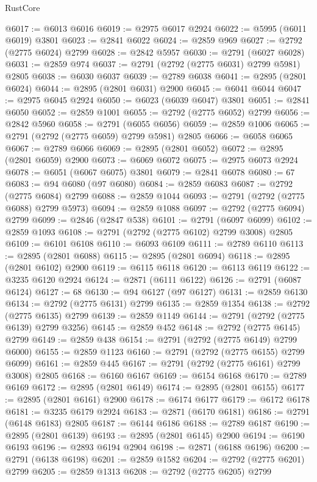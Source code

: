 \begin{lexlean}{RustCore}
\begin{coremodule}
@6017 := @6013 @6016
@6019 := @2975 @6017 @2924
@6022 := @5995 (@6011 @6019) @3801
@6023 := @2841 @6022
@6024 := @2859 @969
@6027 := @2792 (@2775 @6024) @2799
@6028 := @2842 @5957
@6030 := @2791 (@6027 @6028)
@6031 := @2859 @974
@6037 := @2791 (@2792 (@2775 @6031) @2799 @5981) @2805
@6038 := @6030 @6037
@6039 := @2789 @6038
@6041 := @2895 (@2801 @6024)
@6044 := @2895 (@2801 @6031) @2900
@6045 := @6041 @6044
@6047 := @2975 @6045 @2924
@6050 := @6023 (@6039 @6047) @3801
@6051 := @2841 @6050
@6052 := @2859 @1001
@6055 := @2792 (@2775 @6052) @2799
@6056 := @2842 @5960
@6058 := @2791 (@6055 @6056)
@6059 := @2859 @1006
@6065 := @2791 (@2792 (@2775 @6059) @2799 @5981) @2805
@6066 := @6058 @6065
@6067 := @2789 @6066
@6069 := @2895 (@2801 @6052)
@6072 := @2895 (@2801 @6059) @2900
@6073 := @6069 @6072
@6075 := @2975 @6073 @2924
@6078 := @6051 (@6067 @6075) @3801
@6079 := @2841 @6078
@6080 := 67
@6083 := @94 @6080 (@97 @6080)
@6084 := @2859 @6083
@6087 := @2792 (@2775 @6084) @2799
@6088 := @2859 @1044
@6093 := @2791 (@2792 (@2775 @6088) @2799 @5973)
@6094 := @2859 @1088
@6097 := @2792 (@2775 @6094) @2799
@6099 := @2846 (@2847 @538)
@6101 := @2791 (@6097 @6099)
@6102 := @2859 @1093
@6108 := @2791 (@2792 (@2775 @6102) @2799 @3008) @2805
@6109 := @6101 @6108
@6110 := @6093 @6109
@6111 := @2789 @6110
@6113 := @2895 (@2801 @6088)
@6115 := @2895 (@2801 @6094)
@6118 := @2895 (@2801 @6102) @2900
@6119 := @6115 @6118
@6120 := @6113 @6119
@6122 := @3235 @6120 @2924
@6124 := @2871 (@6111 @6122)
@6126 := @2791 (@6087 @6124)
@6127 := 68
@6130 := @94 @6127 (@97 @6127)
@6131 := @2859 @6130
@6134 := @2792 (@2775 @6131) @2799
@6135 := @2859 @1354
@6138 := @2792 (@2775 @6135) @2799
@6139 := @2859 @1149
@6144 := @2791 (@2792 (@2775 @6139) @2799 @3256)
@6145 := @2859 @452
@6148 := @2792 (@2775 @6145) @2799
@6149 := @2859 @438
@6154 := @2791 (@2792 (@2775 @6149) @2799 @6000)
@6155 := @2859 @1123
@6160 := @2791 (@2792 (@2775 @6155) @2799 @6099)
@6161 := @2859 @445
@6167 := @2791 (@2792 (@2775 @6161) @2799 @3008) @2805
@6168 := @6160 @6167
@6169 := @6154 @6168
@6170 := @2789 @6169
@6172 := @2895 (@2801 @6149)
@6174 := @2895 (@2801 @6155)
@6177 := @2895 (@2801 @6161) @2900
@6178 := @6174 @6177
@6179 := @6172 @6178
@6181 := @3235 @6179 @2924
@6183 := @2871 (@6170 @6181)
@6186 := @2791 (@6148 @6183) @2805
@6187 := @6144 @6186
@6188 := @2789 @6187
@6190 := @2895 (@2801 @6139)
@6193 := @2895 (@2801 @6145) @2900
@6194 := @6190 @6193
@6196 := @2893 @6194 @2904
@6198 := @2871 (@6188 @6196)
@6200 := @2791 (@6138 @6198)
@6201 := @2859 @1582
@6204 := @2792 (@2775 @6201) @2799
@6205 := @2859 @1313
@6208 := @2792 (@2775 @6205) @2799

\end{coremodule}
\end{lexlean}
